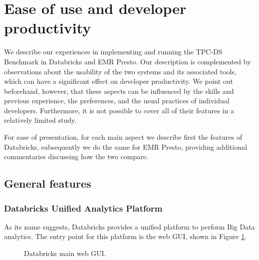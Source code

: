 \section{Ease of use and developer productivity}\label{usability}
We describe our experiences in implementing and running the TPC-DS Benchmark in Databricks and EMR Presto. Our description is complemented by observations about the usability of the two systems and its associated tools, which can have a significant effect on developer productivity. We point out beforehand, however, that these aspects can be influenced by the skills and previous experience, the preferences, and the usual practices of individual developers. Furthermore, it is not possible to cover all of their features in a relatively limited study.

For ease of presentation, for each main aspect we describe first the features of Databricks, subsequently we do the same for EMR Presto, providing additional commentaries discussing how the two compare.

\subsection{General features}
\subsubsection{Databricks Unified Analytics Platform}
As its name suggests, Databricks provides a unified platform to perform Big Data analytics. The entry point for this platform is the web GUI, shown in Figure \ref{fig:databricksMainGUI}.

\begin{figure}
   \begin{center}
   \end{center}
   \caption{Databricks main web GUI.}
   \label{fig:databricksMainGUI}
\end{figure}

